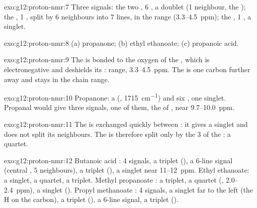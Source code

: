 \begin{solution}{exo:g12:proton-nmr:7}
Three signals: the two , 6 , a doublet (1
neighbour, the ); the , 1 , split by 6 neighbours
into 7 lines, in the  range (3.3--\qty{4.5}{ppm}); the
, 1 , a singlet.
\end{solution}

\begin{solution}{exo:g12:proton-nmr:8}
(a) propanone; (b) ethyl ethanoate; (c) propanoic acid.
\end{solution}

\begin{solution}{exo:g12:proton-nmr:9}
The  is bonded to the oxygen  of the , which is
electronegative and deshields its :  range,
3.3--\qty{4.5}{ppm}. The  is one carbon further away and stays in
the chain range.
\end{solution}

\begin{solution}{exo:g12:proton-nmr:10}
Propanone: a  (, \qty{1715}{cm^{-1}}) and six , one singlet. Propanal would give three signals, one of them,
the   of , near 9.7--\qty{10.0}{ppm}.
\end{solution}

\begin{solution}{exo:g12:proton-nmr:11}
The   is exchanged quickly between : it gives a
singlet and does not split its neighbours. The  is therefore
split only by the 3  of the : a quartet.
\end{solution}

\begin{solution}{exo:g12:proton-nmr:12}
Butanoic acid : 4 signals, a triplet (), a
6-line signal (central , 5 neighbours), a triplet
(), a singlet near 11--\qty{12}{ppm}. Ethyl ethanoate: a
singlet, a quartet, a triplet. Methyl propanoate :
a triplet, a quartet (, 2.0--\qty{2.4}{ppm}), a singlet
(). Propyl methanoate : 4 signals, a
singlet far to the left (the H on the  carbon), a triplet
(), a 6-line signal, a triplet ().
\end{solution}

